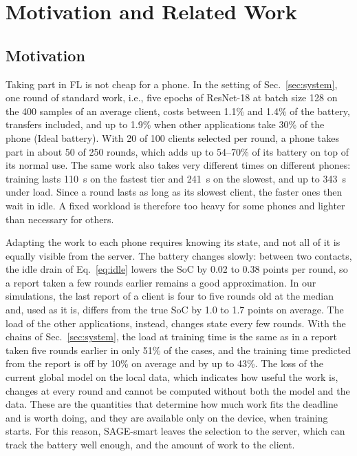 \section{Motivation and Related Work}\label{sec:background}

\subsection{Motivation}\label{sec:motivation}

Taking part in FL is not cheap for a phone. In the setting of
Sec.~\ref{sec:system}, one round of standard work, i.e., five epochs of
ResNet-18 at batch size 128 on the 400 samples of an average client, costs
between 1.1\% and 1.4\% of the battery, transfers included, and up to 1.9\%
when other applications take 30\% of the phone (Ideal battery). With 20 of 100
clients selected per round, a phone takes part in about 50 of 250 rounds, which
adds up to 54--70\% of its battery on top of its normal use. The same work also
takes very different times on different phones: training lasts 110~s on the
fastest tier and 241~s on the slowest, and up to 343~s under load. Since a round
lasts as long as its slowest client, the faster ones then wait in idle. A fixed
workload is therefore too heavy for some phones and lighter than necessary for
others.

Adapting the work to each phone requires knowing its state, and not all of it
is equally visible from the server. The battery changes slowly: between two
contacts, the idle drain of Eq.~\eqref{eq:idle} lowers the SoC by 0.02 to 0.38
points per round, so a report taken a few rounds earlier remains a good
approximation. In our simulations, the last report of a client is four to five
rounds old at the median and, used as it is, differs from the true SoC by 1.0
to 1.7 points on average. The load of the other applications, instead, changes state every few
rounds. With the chains of Sec.~\ref{sec:system}, the load at training time is
the same as in a report taken five rounds earlier in only 51\% of the cases,
and the training time predicted from the report is off by 10\% on average and
by up to 43\%. The loss of the current global model on the local data, which
indicates how useful the work is, changes at every round and cannot be computed
without both the model and the data. These are the quantities that determine
how much work fits the deadline and is worth doing, and they are available only
on the device, when training starts. For this reason, SAGE-smart leaves the
selection to the server, which can track the battery well enough, and the
amount of work to the client.

